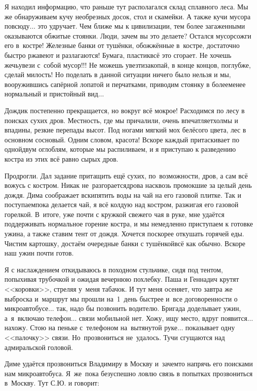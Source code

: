 Я находил информацию, что раньше тут располагался склад сплавного леса. Мы же обнаруживаем кучу необрезных досок, стол и скамейки. А также кучи мусора повсюду$\ldots$ это удручает. Чем ближе мы к цивилизации, тем более загаженными оказываются обжитые стоянки. Люди, зачем вы это делаете? Остался мусор\mdash сожги его в~костре! Железные банки от тушёнки, обожжённые в~костре, достаточно быстро ржавеют и разлагаются! Бумага, пластик\mdash всё это сгорает. Не хочешь жечь\mdash увези с~собой мусор!!! Не можешь увезти\mdash закопай, в конце концов, поглубже, сделай милость! Но поделать в данной ситуации ничего было нельзя и мы, вооружившись сапёрной лопатой и перчатками, приводим стоянку в более\sdash менее нормальный и пристойный вид$\ldots$ 

Дождик постепенно прекращается, но вокруг всё мокрое! Расходимся по лесу в поисках сухих дров. Местность, где мы причалили, очень впечатляет\mdash холмы и впадины, резкие перепады высот. Под ногами мягкий мох белёсого цвета, лес в основном сосновый. Одним словом, красота! Вскоре каждый притаскивает по одной\sdash двум оглоблям, которые мы распиливаем, и я приступаю к разведению костра из этих всё равно сырых дров. 

Продрогли. Дал задание притащить ещё сухих, по~возможности, дров, а сам всё вожусь с костром. Никак не~разгорается\mdash дрова насквозь промокшие за целый день дождя. Дима соображает вскипятить воды на чай на его газовой плитке. Так и поступаем\mdash пока делается чай, я всё колдую над костром, разжигая его газовой горелкой. В~итоге, уже почти с кружкой свежего чая в руке, мне удаётся поддерживать нормальное горение костра, и мы немедленно приступаем к готовке ужина, а также ставим тент от дождя. Хочется поскорее откушать горячей еды. Чистим картошку, достаём очередные банки с тушёнкой\mdash всё как обычно. Вскоре наш ужин почти готов. 

Я с наслаждением откидываюсь в походном стульчике, сидя под тентом, попыхивая трубочкой и ожидая вечернюю похлебку. Паша и Геннадич крутят <<коровки>>, стреляя у~меня табачок. И тут меня осеняет, что завтра же выброска и~маршрут мы прошли на~1~день быстрее и~все договоренности о микроавтобусе$\ldots$ так, надо бы позвонить водителю. Бригада доделывает ужин, а~я~включаю телефон$\ldots$ связи мобильной нет. Хожу, ищу место, вдруг появится$\ldots$ нахожу. Стою на пеньке с~телефоном на~вытянутой руке$\ldots$ показывает одну <<палочку>> связи. Но~прозвониться не~удалось. Тучи сгущаются над адмиральской головой. 

Диме удаётся прозвониться Владимиру в Москву и~зачем\sdash то напрячь его поисками нам микроавтобуса. Я~же~пока безуспешно ловлю связь в попытках прозвониться в~Москву. Тут С.Ю. и говорит:

